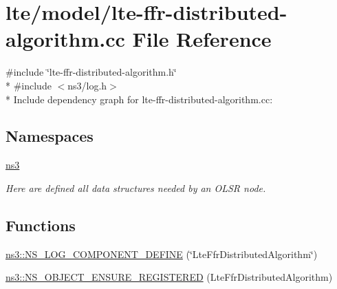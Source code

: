 \hypertarget{lte-ffr-distributed-algorithm_8cc}{}\section{lte/model/lte-\/ffr-\/distributed-\/algorithm.cc File Reference}
\label{lte-ffr-distributed-algorithm_8cc}
{\ttfamily \#include \char`\"{}lte-\/ffr-\/distributed-\/algorithm.\+h\char`\"{}}\\*
{\ttfamily \#include $<$ns3/log.\+h$>$}\\*
Include dependency graph for lte-\/ffr-\/distributed-\/algorithm.cc\+:
\subsection*{Namespaces}
\begin{DoxyCompactItemize}
\item 
 \hyperlink{namespacens3}{ns3}
\begin{DoxyCompactList}\small\item\em Here are defined all data structures needed by an O\+L\+SR node. \end{DoxyCompactList}\end{DoxyCompactItemize}
\subsection*{Functions}
\begin{DoxyCompactItemize}
\item 
\hyperlink{namespacens3_a67df8faca60841d9107b9cfa779cf487}{ns3\+::\+N\+S\+\_\+\+L\+O\+G\+\_\+\+C\+O\+M\+P\+O\+N\+E\+N\+T\+\_\+\+D\+E\+F\+I\+NE} (\char`\"{}Lte\+Ffr\+Distributed\+Algorithm\char`\"{})
\item 
\hyperlink{namespacens3_a4d171f28a4079b8f1a599f572c77bf3b}{ns3\+::\+N\+S\+\_\+\+O\+B\+J\+E\+C\+T\+\_\+\+E\+N\+S\+U\+R\+E\+\_\+\+R\+E\+G\+I\+S\+T\+E\+R\+ED} (Lte\+Ffr\+Distributed\+Algorithm)
\end{DoxyCompactItemize}
